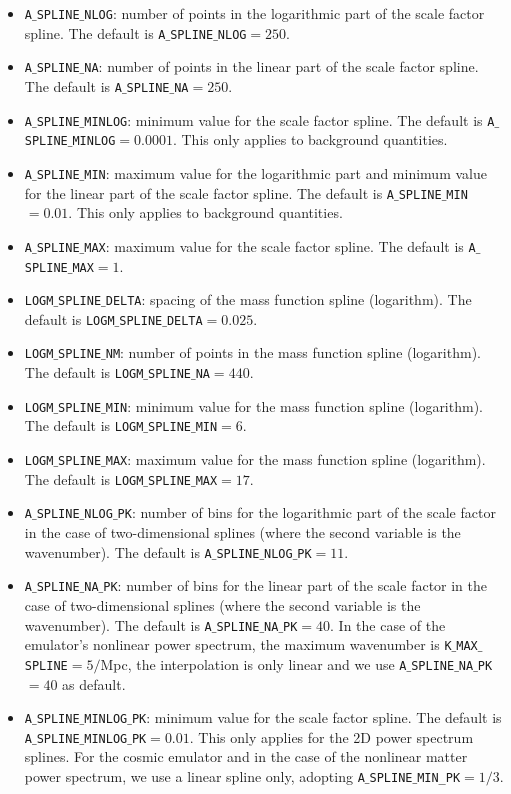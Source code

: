 \documentclass[\docopts]{\docclass}
\begin{document}
\begin{itemize}
\item {\tt A$\_$SPLINE$\_$NLOG}: number of points in the logarithmic part of the scale factor spline. The default is {\tt A$\_$SPLINE$\_$NLOG}$=250$.
\item {\tt A$\_$SPLINE$\_$NA}: number of points in the linear part of the scale factor spline. The default is {\tt A$\_$SPLINE$\_$NA}$=250$.
\item {\tt A$\_$SPLINE$\_$MINLOG}: minimum value for the scale factor spline. The default is {\tt A$\_$SPLINE$\_$MINLOG}$=0.0001$. This only applies to background quantities.
\item {\tt A$\_$SPLINE$\_$MIN}: maximum value for the logarithmic part and minimum value for the linear part of the scale factor spline. The default is {\tt A$\_$SPLINE$\_$MIN}$=0.01$. This only applies to background quantities.
\item {\tt A$\_$SPLINE$\_$MAX}: maximum value for the scale factor spline. The default is {\tt A$\_$SPLINE$\_$MAX}$=1$.
\item {\tt LOGM$\_$SPLINE$\_$DELTA}: spacing of the mass function spline (logarithm). The default is {\tt LOGM$\_$SPLINE$\_$DELTA}$=0.025$.
\item {\tt LOGM$\_$SPLINE$\_$NM}: number of points in the mass function spline (logarithm). The default is {\tt LOGM$\_$SPLINE$\_$NA}$=440$.
\item {\tt LOGM$\_$SPLINE$\_$MIN}: minimum value for the mass function spline (logarithm). The default is {\tt LOGM$\_$SPLINE$\_$MIN}$=6$.
\item {\tt LOGM$\_$SPLINE$\_$MAX}: maximum value for the mass function spline (logarithm). The default is {\tt LOGM$\_$SPLINE$\_$MAX}$=17$.
\item {\tt A$\_$SPLINE$\_$NLOG$\_$PK}: number of bins for the logarithmic part of the scale factor in the case of two-dimensional splines (where the second variable is the wavenumber). The default is {\tt A$\_$SPLINE$\_$NLOG$\_$PK}$=11$.
\item {\tt A$\_$SPLINE$\_$NA$\_$PK}: number of bins for the linear part of the scale factor in the case of two-dimensional splines (where the second variable is the wavenumber). The default is {\tt A$\_$SPLINE$\_$NA$\_$PK}$=40$. In the case of the emulator's nonlinear power spectrum, the maximum wavenumber is {\tt K$\_$MAX$\_$SPLINE}$=5/$Mpc, the interpolation is only linear and we use {\tt A$\_$SPLINE$\_$NA$\_$PK}$=40$ as default. 
\item {\tt A$\_$SPLINE$\_$MINLOG$\_$PK}: minimum value for the scale factor spline. The default is {\tt A$\_$SPLINE$\_$MINLOG$\_$PK}$=0.01$. This only applies for the 2D power spectrum splines. For the cosmic emulator and in the case of the nonlinear matter power spectrum, we use a linear spline only, adopting {\tt A$\_$SPLINE$\_$MIN\_PK}$=1/3$.

\end{itemize}
\end{document}
